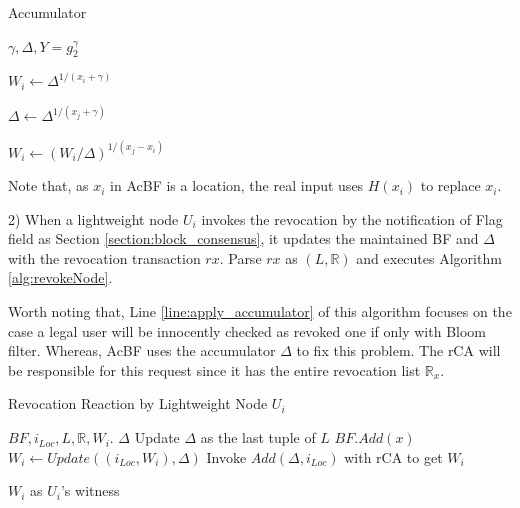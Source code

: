 \documentclass[conference]{IEEEtran}
\begin{document}
\begin{algorithm}[t]
	\renewcommand{\algorithmicensure}{\textbf{Output:}}
	\caption{Accumulator}\label{alg:accumulate}
	\begin{algorithmic}[1]
		\Require $\gamma, \Delta, Y= g_2^\gamma$ %
		
		\Return $W_i \gets \Delta ^{1/(x_i + \gamma)}$
		\EndFunction
		
		
		\Return $\Delta \gets \Delta ^{1/(x_j + \gamma)}$
		\EndFunction
		 \label{fuction:update}
		
		\Return $W_i \gets (W_i/\Delta)^{1/(x_j - x_i)}$
		\EndFunction
	\end{algorithmic}
Note that, as $x_i$ in AcBF is a location, the real input uses $H(x_i)$ to replace $x_i$. 
\end{algorithm}

2) When a lightweight node $U_i$ invokes the revocation by the notification of Flag field as Section \ref{section:block_consensus}, it updates the maintained BF and $\Delta$ with the revocation transaction $rx$. Parse $rx$ as $(L, \mathbb{R})$ and executes Algorithm \ref{alg:revokeNode}.

Worth noting that, Line \ref{line:apply_accumulator} of this algorithm focuses on the case a legal user will be innocently checked as revoked one if only with Bloom filter. Whereas, AcBF uses the accumulator $\Delta$ to fix this problem. The rCA will be responsible for this request since it has the entire revocation list $\mathbb{R}_x$.

\begin{algorithm}[t]
	\renewcommand{\algorithmicensure}{\textbf{Output:}}
	\caption{Revocation Reaction by Lightweight Node $U_i$}\label{alg:revokeNode}
	\begin{algorithmic}[1]
		\Require $BF, i_{Loc}, L, \mathbb{R}, W_i$. 
		\Ensure $\Delta$
		\State Update $\Delta$ as the last tuple of $L$
		\EndIf
		\State $BF.Add(x)$ 
		\EndFor
		\State $W_i\gets Update((i_{Loc}, W_i), \Delta)$ 
		\EndFor
		\State Invoke $Add(\Delta, i_{Loc})$ with rCA to get $W_i$ \label{line:apply_accumulator}
		
		\Return $W_i$ as $U_i$'s witness
		\EndIf
	\end{algorithmic}
\end{algorithm}
\end{document}
